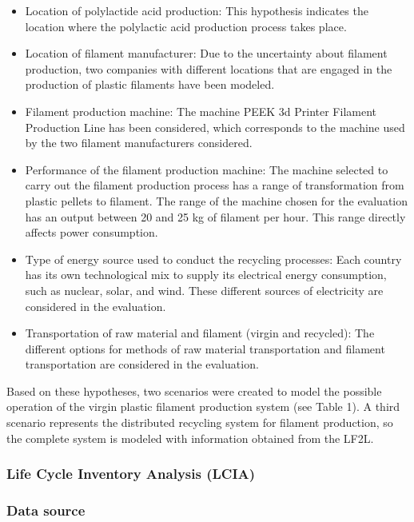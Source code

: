 \documentclass[]{elsarticle} %
\begin{document}
\begin{itemize}
\item
  Location of polylactide acid production: This hypothesis indicates the location where the polylactic acid production process takes place.
\item
  Location of filament manufacturer: Due to the uncertainty about filament production, two companies with different locations that are engaged in the production of plastic filaments have been modeled.
\item
  Filament production machine: The machine PEEK 3d Printer Filament Production Line has been considered, which corresponds to the machine used by the two filament manufacturers considered.
\item
  Performance of the filament production machine: The machine selected to carry out the filament production process has a range of transformation from plastic pellets to filament. The range of the machine chosen for the evaluation has an output between 20 and 25 kg of filament per hour. This range directly affects power consumption.
\item
  Type of energy source used to conduct the recycling processes: Each country has its own technological mix to supply its electrical energy consumption, such as nuclear, solar, and wind. These different sources of electricity are considered in the evaluation.
\item
  Transportation of raw material and filament (virgin and recycled): The different options for methods of raw material transportation and filament transportation are considered in the evaluation.
\end{itemize}

Based on these hypotheses, two scenarios were created to model the possible operation of the virgin plastic filament production system (see Table 1). A third scenario represents the distributed recycling system for filament production, so the complete system is modeled with information obtained from the LF2L.

\hypertarget{life-cycle-inventory-analysis-lcia}{%
\subsubsection{Life Cycle Inventory Analysis (LCIA)}\label{life-cycle-inventory-analysis-lcia}}

\hypertarget{data-source}{%
\subsubsection{Data source}\label{data-source}}
\end{document}
